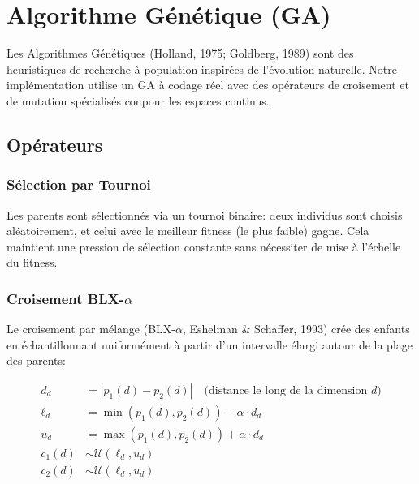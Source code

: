\documentclass[12pt,a4paper,oneside]{report}
\begin{document}
\section{Algorithme G\'en\'etique (GA)}

Les Algorithmes G\'en\'etiques (Holland, 1975; Goldberg, 1989) sont des heuristiques de recherche \`a population inspir\'ees de l'\'evolution naturelle. Notre impl\'ementation utilise un GA \`a codage r\'eel avec des op\'erateurs de croisement et de mutation sp\'ecialis\'es con pour les espaces continus.

\subsection{Op\'erateurs}

\subsubsection{S\'election par Tournoi}

Les parents sont s\'electionn\'es via un tournoi binaire: deux individus sont choisis al\'eatoirement, et celui avec le meilleur fitness (le plus faible) gagne. Cela maintient une pression de s\'election constante sans n\'ecessiter de mise \`a l'\'echelle du fitness.

\subsubsection{Croisement BLX-$\alpha$}

Le croisement par m\'elange (BLX-$\alpha$, Eshelman \& Schaffer, 1993) cr\'ee des enfants en \'echantillonnant uniform\'ement \`a partir d'un intervalle \'elargi autour de la plage des parents:

\begin{equation}\label{eq:blx}
\begin{aligned}
d_d &= |p_1(d) - p_2(d)| \quad \text{(distance le long de la dimension $d$)} \\
\ell_d &= \min(p_1(d), p_2(d)) - \alpha \cdot d_d \\
u_d   &= \max(p_1(d), p_2(d)) + \alpha \cdot d_d \\
c_1(d) &\sim \mathcal{U}(\ell_d, u_d) \\
c_2(d) &\sim \mathcal{U}(\ell_d, u_d)
\end{aligned}
\end{equation}
\end{document}

